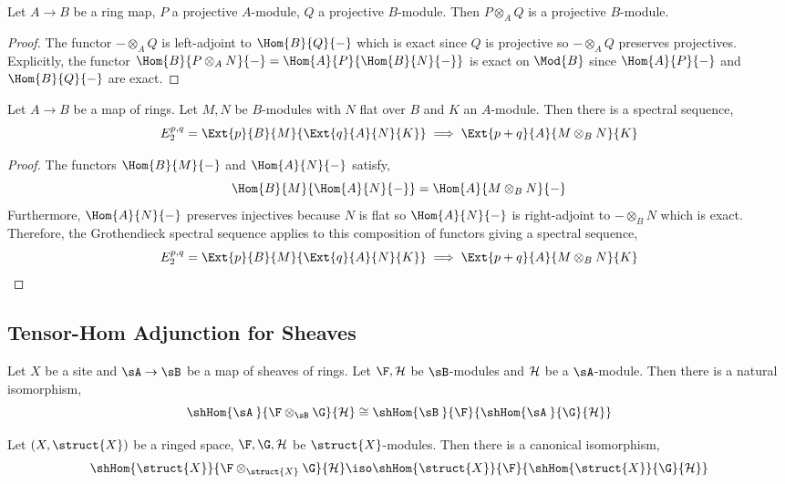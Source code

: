 \documentclass[12pt]{article}
\begin{document}
\begin{cor}
Let $A \to B$ be a ring map, $P$ a projective $A$-module, $Q$ a projective $B$-module. Then $P \otimes_A Q$ is a projective $B$-module.
\end{cor}

\begin{proof}
The functor $- \otimes_A Q$ is left-adjoint to $\Hom{B}{Q}{-}$ which is exact since $Q$ is projective so $- \otimes_A Q$ preserves projectives. Explicitly, the functor $\Hom{B}{P \otimes_A N}{-} = \Hom{A}{P}{\Hom{B}{N}{-}}$ is exact on $\Mod{B}$ since $\Hom{A}{P}{-}$ and $\Hom{B}{Q}{-}$ are exact.
\end{proof}

\begin{theorem}
Let $A \to B$ be a map of rings. Let $M, N$ be $B$-modules with $N$ flat over $B$ and $K$ an $A$-module. Then there is a spectral sequence,
\[ E^{p,q}_2 = \Ext{p}{B}{M}{\Ext{q}{A}{N}{K}} \implies \Ext{p+q}{A}{M \otimes_B N}{K} \]
\end{theorem}

\begin{proof}
The functors $\Hom{B}{M}{-}$ and $\Hom{A}{N}{-}$ satisfy,
\[ \Hom{B}{M}{\Hom{A}{N}{-}} = \Hom{A}{M \otimes_B N}{-} \]
Furthermore, $\Hom{A}{N}{-}$ preserves injectives because $N$ is flat so $\Hom{A}{N}{-}$ is right-adjoint to $- \otimes_B N$ which is exact. Therefore, the Grothendieck spectral sequence applies to this composition of functors giving a spectral sequence,
\[ E^{p,q}_2 = \Ext{p}{B}{M}{\Ext{q}{A}{N}{K}} \implies \Ext{p+q}{A}{M \otimes_B N}{K} \]
\end{proof}

\subsection{Tensor-Hom Adjunction for Sheaves}


\begin{prop} \label{tensor_hom_adjunction_sites}
Let $X$ be a site and $\sA \to \sB$ be a map of sheaves of rings. Let $\F, \H$ be $\sB$-modules and $\mathcal{H}$ be a $\sA$-module. Then there is a natural isomorphism,
\[ \shHom{\sA \:}{\F \otimes_{\sB} \G}{\H} \cong \shHom{\sB \:}{\F}{\shHom{\sA \:}{\G}{\H}} \]
\end{prop}

\begin{prop}
Let $(X, \struct{X})$ be a ringed space, $\F, \G, \H$ be $\struct{X}$-modules. Then there is a canonical isomorphism,
\[ \shHom{\struct{X}}{\F \otimes_{\struct{X}} \G}{\H} \iso \shHom{\struct{X}}{\F}{\shHom{\struct{X}}{\G}{\H}} \]
\end{prop}
\end{document}
